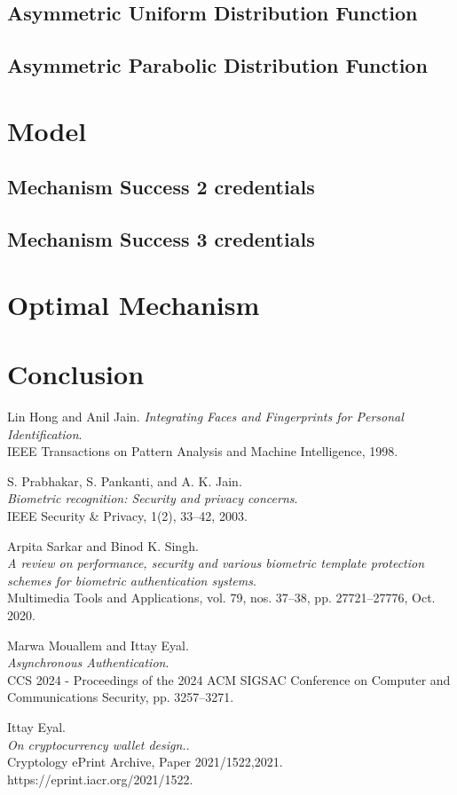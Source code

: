 \documentclass{article}
\begin{document}
\subsection{Asymmetric Uniform Distribution Function}
\subsection{Asymmetric Parabolic Distribution Function}
\section{Model}
\subsection{Mechanism Success 2 credentials}
\subsection{Mechanism Success 3 credentials}
\section{Optimal Mechanism}
\section{Conclusion}
\begin{thebibliography}{9}

Lin Hong and Anil Jain.
\textit{Integrating Faces and Fingerprints for Personal Identification}.\\
IEEE Transactions on Pattern Analysis and Machine Intelligence, 1998.

S. Prabhakar, S. Pankanti, and A. K. Jain.\\
\textit{Biometric recognition: Security and privacy concerns}.\\
IEEE Security \& Privacy, 1(2), 33–42, 2003.

Arpita Sarkar and Binod K. Singh.\\
\textit{A review on performance, security and various biometric template protection schemes for biometric authentication systems}.\\
Multimedia Tools and Applications, vol. 79, nos. 37–38, pp. 27721–27776, Oct. 2020.

Marwa Mouallem and Ittay Eyal.\\
\textit{Asynchronous Authentication}.\\
CCS 2024 - Proceedings of the 2024 ACM SIGSAC Conference on Computer and Communications Security, pp. 3257–3271.

Ittay Eyal.\\
\textit{On cryptocurrency wallet design.}.\\
Cryptology ePrint Archive, Paper 2021/1522,2021. https://eprint.iacr.org/2021/1522.
\end{thebibliography}
\end{document}

